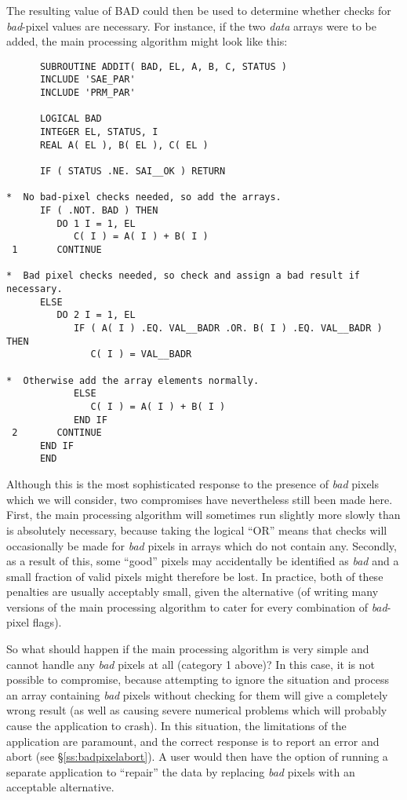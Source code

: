 \documentclass[twoside,11pt]{article}
\newcommand{\st}[1]{{\em{#1}}}
\begin{document}
The resulting value of BAD could then be used to determine whether checks
for \st{bad\/}-pixel values are necessary. 
For instance, if the two \st{data\/} arrays were to be added, the main
processing algorithm might look like this: 

\small
\begin{verbatim}
      SUBROUTINE ADDIT( BAD, EL, A, B, C, STATUS )
      INCLUDE 'SAE_PAR'
      INCLUDE 'PRM_PAR'

      LOGICAL BAD
      INTEGER EL, STATUS, I
      REAL A( EL ), B( EL ), C( EL )

      IF ( STATUS .NE. SAI__OK ) RETURN

*  No bad-pixel checks needed, so add the arrays.
      IF ( .NOT. BAD ) THEN
         DO 1 I = 1, EL
            C( I ) = A( I ) + B( I )
 1       CONTINUE

*  Bad pixel checks needed, so check and assign a bad result if necessary.
      ELSE
         DO 2 I = 1, EL
            IF ( A( I ) .EQ. VAL__BADR .OR. B( I ) .EQ. VAL__BADR ) THEN
               C( I ) = VAL__BADR

*  Otherwise add the array elements normally.
            ELSE
               C( I ) = A( I ) + B( I )
            END IF
 2       CONTINUE
      END IF
      END
\end{verbatim}
\normalsize

Although this is the most sophisticated response to the presence of
\st{bad\/} pixels which we will consider, two compromises have
nevertheless 
still been made here. 
First, the main processing algorithm will sometimes run slightly more slowly
than is absolutely necessary, because taking the logical ``OR'' means that
checks will occasionally be made for \st{bad\/} pixels in arrays which do not
contain any. 
Secondly, as a result of this, some ``good'' pixels may accidentally be
identified as \st{bad\/} and a small fraction of valid pixels might therefore
be lost. 
In practice, both of these penalties are usually acceptably small, given the
alternative (of writing many versions of the main processing algorithm to
cater for every combination of \st{bad\/}-pixel flags). 

So what should happen if the main processing algorithm is very simple and
cannot handle any \st{bad\/} pixels at all (category 1 above)? 
In this case, it is not possible to compromise, because attempting to ignore
the situation and process an array containing \st{bad\/} pixels without
checking for them will give a completely wrong result (as well as causing
severe numerical problems which will probably cause the application to
crash). 
In this situation, the limitations of the application are paramount, and the
correct response is to report an error and abort (see 
\S\ref{ss:badpixelabort}). 
A user would then have the option of running a separate application to
``repair'' the data by replacing \st{bad\/} pixels with an acceptable
alternative. 
\end{document}
